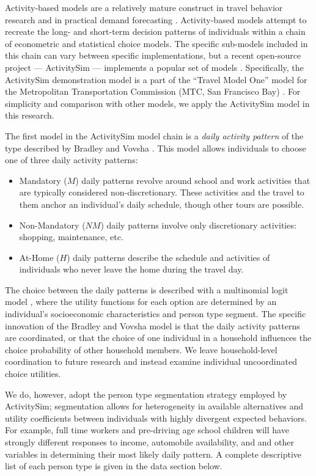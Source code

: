 \documentclass[3p, authoryear, review]{elsarticle} %
\providecommand{\tightlist}{%
  \setlength{\itemsep}{0pt}\setlength{\parskip}{0pt}}
\begin{document}
Activity-based models are a relatively mature construct in travel behavior
research and in practical demand forecasting \cite{rasouli2014activity}. Activity-based models attempt
to recreate the long- and short-term decision patterns of individuals within a
chain of econometric and statistical choice models. The specific sub-models included
in this chain can vary between specific implementations, but a recent
open-source project --- ActivitySim \cite{activitysim} --- implements a popular
set of models \cite{davidson2010ct}. Specifically, the ActivitySim demonstration
model is a part of the ``Travel Model One'' model for the Metropolitan
Transportation Commission (MTC, San Francisco Bay) \cite{erhardt2012mtc}.
For simplicity and comparison with other models, we apply the ActivitySim model
in this research.

The first model in the ActivitySim model chain is a \emph{daily activity pattern}
of the type described by Bradley and Vovsha \cite{Bradley2005}. This model
allows individuals to choose one of three daily activity patterns:

\begin{itemize}
\tightlist
\item
  Mandatory (\(M\)) daily patterns revolve around school and work activities that
  are typically considered non-discretionary. These activities and the travel
  to them anchor an individual's daily schedule, though other tours are possible.
\item
  Non-Mandatory (\(NM\)) daily patterns involve only discretionary activities:
  shopping, maintenance, etc.
\item
  At-Home (\(H\)) daily patterns describe the schedule and activities of
  individuals who never leave the home during the travel day.
\end{itemize}

The choice between the daily patterns is described with a multinomial logit
model \cite{Domencich1975}, where the utility functions for each option are
determined by an individual's socioeconomic characteristics and person type
segment. The specific innovation of the Bradley and Vovsha model
\cite{Bradley2005} is that the daily activity patterns are coordinated, or that
the choice of one individual in a household influences the choice probability of
other household members. We leave household-level coordination to future
research and instead examine individual uncoordinated choice utilities.

We do, however, adopt the person type segmentation strategy employed by
ActivitySim; segmentation allows for heterogeneity in available
alternatives and utility coefficients between individuals with highly divergent
expected behaviors. For example, full time workers and pre-driving age school children
will have strongly different responses to income, automobile availability, and
and other variables in determining their most likely daily pattern.
A complete descriptive list of each person type is given in the data
section below.
\end{document}
